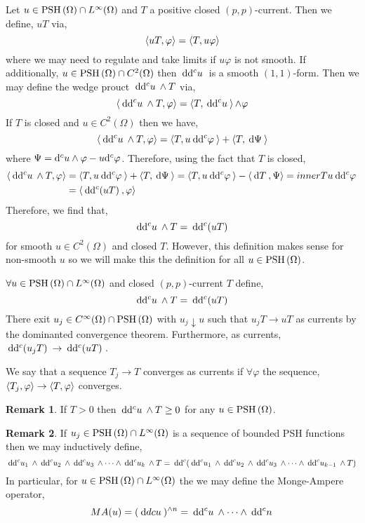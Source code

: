 \documentclass[12pt]{extarticle}
\renewcommand{\d}[1]{\: \mathrm{d}#1 \:}
\theoremstyle{definition}
\newtheorem{remark}{Remark}
\newenvironment{definition}[1][Definition:]{\begin{trivlist}
\item[\hskip \labelsep {\bfseries #1}]}{\end{trivlist}}
\begin{document}
\begin{definition}
Let $u \in \mathrm{PSH}\left( \Omega \right) \cap L^\infty(\Omega)$ and $T$ a positive closed $(p,p)$-current. Then we define, $u T$ via,
\[ \left< uT, \varphi \right> = \left< T, u \varphi \right> \]
where we may need to regulate and take limits if $u \varphi$ is not smooth. If additionally, $u \in \mathrm{PSH}\left( \Omega \right) \cap C^2(\Omega)$ then $\d{\dc u}$ is a smooth $(1,1)$-form. Then we may define the wedge prouct $\d{\dc{u}} \wedge T$ via,
\[ \inner{\d{\dc{u}} \wedge T}{\varphi} = \inner{T}{\d{\dc{u}}}{\wedge \varphi} \]
If $T$ is closed and $u \in C^2(\Omega)$ then we have,
\[ \inner{\d{\dc{u}} \wedge T}{\varphi} = \inner{T}{u \d{\dc{\varphi}}} + \inner{T}{\d{\Psi}} \]
where $\Psi = \mathrm{d}^c{u} \wedge \varphi - u \mathrm{d}^c{\varphi}$. 
Therefore, using the fact that $T$ is closed,
\begin{align*}
\inner{\d{\dc{u}} \wedge T}{\varphi} & = \inner{T}{u \d{\dc{\varphi}}} + \inner{T}{\d{\Psi}} = \inner{T}{u \d{\dc{\varphi}}} - \inner{\d{T}}{\Psi} = inner{T}{u \d{\dc{\varphi}}} 
\\
& = \inner{\d{\dc{(u T)}}}{\varphi}
\end{align*}
Therefore, we find that,
\[ \d{\dc{u}} \wedge T = \d{\dc(u T)} \]
for smooth $u \in C^2(\Omega)$ and closed $T$. However, this definition makes sense for non-smooth $u$ so we will make this the definition for all $u \in \mathrm{PSH}\left( \Omega \right)$. 
\end{definition}


\begin{definition}
$\forall u \in \mathrm{PSH}\left( \Omega \right) \cap L^\infty(\Omega)$ and closed $(p,p)$-current $T$ define,
\[ \d{\dc{u}} \wedge T = \d{\dc{(uT)}} \] 
There exit $u_j \in C^\infty(\Omega) \cap \mathrm{PSH}\left( \Omega \right)$ with $u_j \downarrow u$ such that $u_j T \to u T$ as currents by the dominanted convergence theorem. Furthermore, as currents, $\d{\dc{(u_j T)}} \to \d{\dc{(uT)}}$. 
\end{definition}

\begin{definition}
We say that a sequence $T_j \to T$ converges as currents if $\forall \varphi$ the sequence, $\left< T_j, \varphi \right> \to \left< T, \varphi \right>$ converges.  
\end{definition}

\begin{remark}
If $T > 0$ then $\d{\dc{u}} \wedge T \ge 0$ for any $u \in \mathrm{PSH}\left( \Omega \right)$. 
\end{remark}

\begin{remark}
If $u_j \in \mathrm{PSH}\left( \Omega \right) \cap L^\infty(\Omega)$ is a sequence of bounded PSH functions then we may inductively define,
\[  \d{\dc{u_1}} \wedge \d{\dc{u_2}} \wedge \d{\dc{u_3}} \wedge \cdots \wedge \d{\dc{u_k}} \wedge T = \d{\dc{ \left( \d{\dc{u_1}} \wedge \d{\dc{u_2}} \wedge \d{\dc{u_3}} \wedge \cdots \wedge \d{\dc{u_{k-1}}} \wedge T \right) }} \] 
In particular, for $u \in \mathrm{PSH}\left( \Omega \right) \cap L^\infty(\Omega)$ the we may define the Monge-Ampere operator,
\[ MA(u) = (\d{dc{u}})^{\wedge n} = \d{\dc{u}} \wedge \cdots \wedge \d{\dc{n}}  \]
\end{remark}
\end{document}
